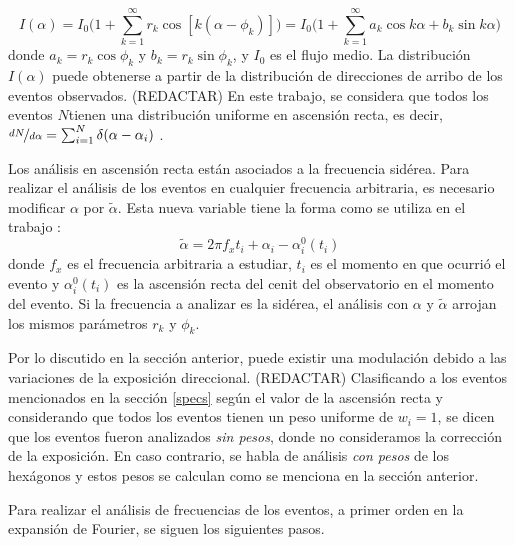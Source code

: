   \begin{equation}
    I(\alpha) = I_0 \bigg ( 1+ \sum^\infty_{k=1} r_k\cos{[k(\alpha - \phi_k)]} \bigg) = I_0 \bigg ( 1+ \sum^\infty_{k=1} a_k\cos{k\alpha} +  b_k\sin{k\alpha} \bigg ) 
  \end{equation}
  donde $a_k=r_k\cos\phi_k$ y $b_k=r_k\sin\phi_k$, y $I_0$ es el flujo medio. La distribución $I(\alpha)$ puede obtenerse a partir de la distribución de direcciones de arribo de los eventos observados. (REDACTAR) En este trabajo, se considera que todos los eventos $N$tienen una distribución uniforme en ascensión recta, es decir, $\nicefrac{dN}{d\alpha}= \sum^N_{i=1} \delta(\alpha - \alpha_i)$ \cite{taborda}. 

  Los análisis en ascensión recta están asociados a la frecuencia sidérea.  Para realizar el análisis de los eventos en cualquier frecuencia arbitraria, es necesario modificar $\alpha$ por $\tilde{\alpha}$. Esta nueva variable tiene la forma como se utiliza en el trabajo \cite{taborda}:
  \begin{equation}
    \tilde{\alpha} = 2\pi f_x t_i + \alpha_i - \alpha_i^0(t_i) \label{ra_mod}
  \end{equation}
  donde $f_x$ es el frecuencia arbitraria a estudiar, $t_i$ es el momento en que ocurrió el evento y $\alpha_i^0(t_i)$ es la ascensión recta del cenit del observatorio en el momento del evento. Si la frecuencia a analizar es la sidérea, el análisis con $\alpha$ y $\tilde{\alpha}$ arrojan los mismos parámetros $r_k$ y $\phi_k$.

  Por lo discutido en la sección anterior, puede existir una modulación debido a las variaciones de la exposición direccional.  (REDACTAR) Clasificando a los eventos mencionados en la sección \ref{specs} según el valor de la ascensión recta y considerando que todos los eventos tienen un peso uniforme de $w_i=1$, se dicen que los eventos fueron analizados \textit{sin pesos}, donde no consideramos la corrección de la exposición. En caso contrario, se habla de análisis \textit{con pesos} de los hexágonos  y estos pesos se calculan como se menciona en la sección anterior.

  Para realizar el análisis de frecuencias de los eventos, a primer orden en la expansión de Fourier, se siguen los siguientes pasos.

